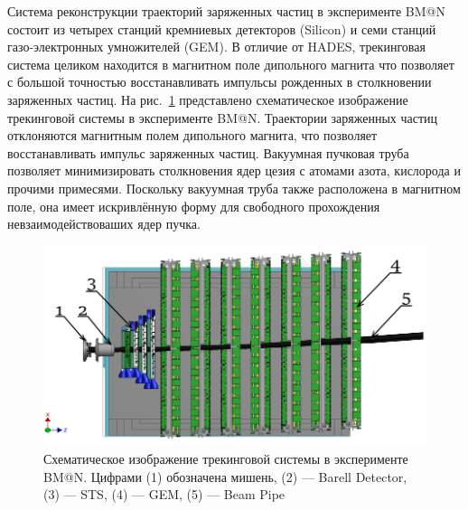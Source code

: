 Система реконструкции траекторий заряженных частиц в эксперименте BM@N состоит из четырех станций кремниевых детекторов (Silicon) и семи станций газо-электронных умножителей (GEM). 
В отличие от HADES, трекинговая система целиком находится в магнитном поле дипольного магнита что позволяет с большой точностью восстанавливать импульсы рожденных в столкновении заряженных частиц.
На рис.~\ref{fig:bmn_tracking} представлено схематическое изображение трекинговой системы в эксперименте BM@N.
Траектории заряженных частиц отклоняются магнитным полем дипольного магнита, что позволяет восстанавливать импульс заряженных частиц.
Вакуумная пучковая труба позволяет минимизировать столкновения ядер цезия с атомами азота, кислорода и прочими примесями.
Поскольку вакуумная труба также расположена в магнитном поле, она имеет искривлённую форму для свободного прохождения невзаимодействоваших ядер пучка.  
%
\begin{figure}[ht]
\begin{center}
    \includegraphics[width=0.75\linewidth]{images/bmn_tracking_system.png}
    \caption{Схематическое изображение трекинговой системы в эксперименте BM@N. Цифрами (1) обозначена мишень,
    (2) --- Barell Detector, (3) --- STS, (4) --- GEM, (5) --- Beam Pipe }
    \label{fig:bmn_tracking}
\end{center}
\end{figure}

